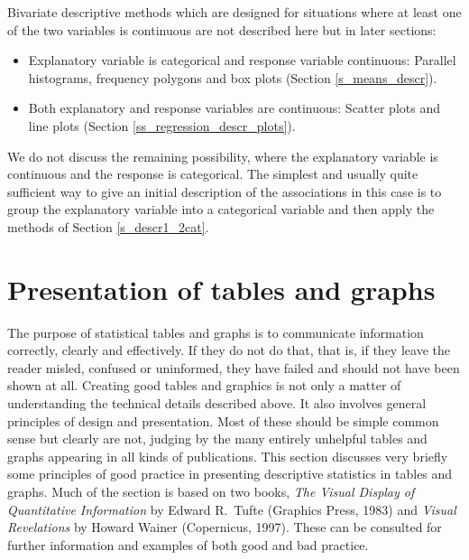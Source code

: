 Bivariate descriptive methods which are designed for situations where at
least one of the two variables is continuous are not described here but
in later sections:
\begin{itemize}
\item
Explanatory variable is categorical and response variable continuous:
Parallel histograms, frequency polygons and box plots (Section
\ref{s_means_descr}).
\item
Both explanatory and response variables are continuous:
Scatter plots and line plots (Section
\ref{ss_regression_descr_plots}).
\end{itemize}
We do not discuss the remaining possibility, where the explanatory
variable is continuous and the response is categorical. The simplest and
usually quite sufficient way to give an initial description of
the  associations in this case is to group the explanatory variable into
a categorical variable and then apply the methods of Section
\ref{s_descr1_2cat}.



\section{Presentation of tables and graphs}
\label{s_descr1_presentation}

The purpose of statistical tables and graphs is to communicate
information correctly, clearly and effectively. If they do not do that,
that is, if they leave the reader misled, confused or uninformed, they have
failed and should not have been shown at all. Creating good
tables and graphics is not only a matter of understanding the technical
details described above. It also involves
general principles of design and presentation. Most of these should be
simple common sense but clearly are not, judging by the many entirely
unhelpful tables and graphs appearing in all kinds of publications. This
section discusses very briefly some principles of good practice in
presenting descriptive statistics in tables and graphs. Much of the
section is based on two books, \emph{The Visual Display of Quantitative
Information} by Edward R.\ Tufte (Graphics Press, 1983) and \emph{Visual
Revelations} by Howard Wainer (Copernicus, 1997). These can be
consulted
for further information and examples of both good and bad practice.

